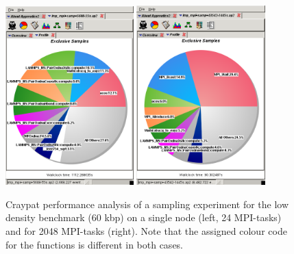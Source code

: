 \documentclass[12pt,onecolumn]{article}
\begin{document}
\begin{figure}[htbp]
\centering
\begin{minipage}{0.92\textwidth}
\centering
\includegraphics[width=0.44\textwidth]{./pics/n1_opt_screenshot1_60kbps.png}
\includegraphics[width=0.443\textwidth]{./pics/p2048_opt_screenshot1_60kbps.png}
\caption{\label{perf-60kbps} Craypat performance analysis of a sampling experiment for the low density benchmark (60 kbp) on a single node (left, 24 MPI-tasks) and for 2048 MPI-tasks (right). Note that the assigned colour code for the functions is different in both cases.}
\end{minipage}
\end{figure}
\end{document}
